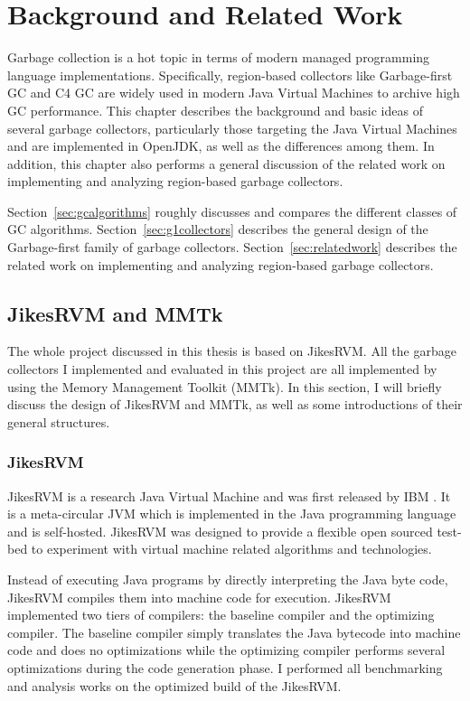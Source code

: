 \chapter{Background and Related Work}
\label{cha:background}

Garbage collection is a hot topic in terms of modern managed programming language
implementations. Specifically, region-based collectors like Garbage-first GC and
C4 GC are widely used in modern Java Virtual Machines to archive high GC performance.
This chapter describes the background and basic ideas of several garbage collectors,
particularly those targeting the Java Virtual Machines and are implemented in OpenJDK,
as well as the differences among them.
In addition, this chapter also performs a general discussion of the related work
on implementing and analyzing region-based garbage collectors.

Section~\ref{sec:gcalgorithms} roughly discusses and compares the different classes of GC algorithms.
Section~\ref{sec:g1collectors} describes the general design of the Garbage-first family of garbage collectors.
Section~\ref{sec:relatedwork} describes the related work on  implementing and analyzing region-based garbage collectors.

\section{JikesRVM and MMTk}

The whole project discussed in this thesis is based on JikesRVM. All the garbage collectors
I implemented and evaluated in this project are all implemented by using the Memory Management Toolkit (MMTk).
In this section, I will briefly discuss the design of JikesRVM and MMTk,
as well as some introductions of their general structures.

\subsection{JikesRVM}

JikesRVM is a research Java Virtual Machine and was first released by IBM \citep{alpern2005jikes}.
It is a meta-circular JVM which is implemented in the Java programming language and is self-hosted.
JikesRVM was designed to provide a flexible open sourced test-bed to
experiment with virtual machine related algorithms and technologies.

Instead of executing Java programs by directly interpreting the Java byte code,
JikesRVM compiles them into machine code for execution.
JikesRVM implemented two tiers of compilers: the baseline compiler and the optimizing compiler.
The baseline compiler simply translates the Java bytecode into machine code and does no
optimizations while the optimizing compiler performs several optimizations during the
code generation phase. I performed all benchmarking and analysis works on the
optimized build of the JikesRVM.

